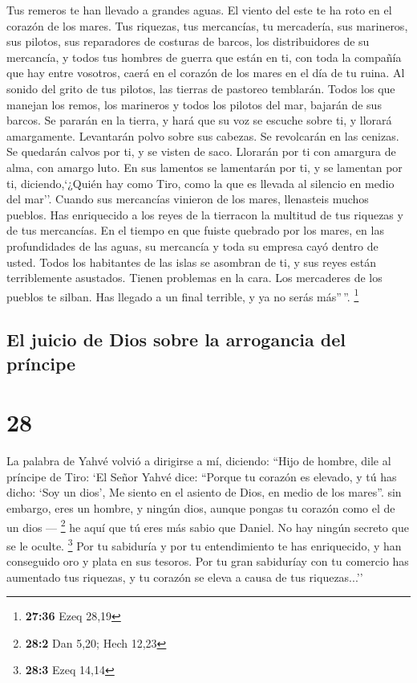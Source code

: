  Tus remeros te han llevado a grandes aguas. El viento
del este te ha roto en el corazón de los mares.  Tus
riquezas, tus mercancías, tu mercadería, sus marineros, sus pilotos, sus
reparadores de costuras de barcos, los distribuidores de su mercancía, y
todos tus hombres de guerra que están en ti, con toda la compañía que
hay entre vosotros, caerá en el corazón de los mares en el día de tu
ruina.  Al sonido del grito de tus pilotos, las tierras
de pastoreo temblarán.  Todos los que manejan los remos,
los marineros y todos los pilotos del mar, bajarán de sus barcos. Se
pararán en la tierra,  y hará que su voz se escuche sobre
ti, y llorará amargamente. Levantarán polvo sobre sus cabezas. Se
revolcarán en las cenizas.  Se quedarán calvos por ti, y
se visten de saco. Llorarán por ti con amargura de alma, con amargo
luto.  En sus lamentos se lamentarán por ti, y se
lamentan por ti, diciendo,`¿Quién hay como Tiro, como la que es llevada
al silencio en medio del mar''.  Cuando sus mercancías
vinieron de los mares, llenasteis muchos pueblos. Has enriquecido a los
reyes de la tierracon la multitud de tus riquezas y de tus mercancías.
 En el tiempo en que fuiste quebrado por los mares, en
las profundidades de las aguas, su mercancía y toda su empresa cayó
dentro de usted.  Todos los habitantes de las islas se
asombran de ti, y sus reyes están terriblemente asustados. Tienen
problemas en la cara.  Los mercaderes de los pueblos te
silban. Has llegado a un final terrible, y ya no serás más''\,''.
\footnote{\textbf{27:36} Ezeq 28,19}

\hypertarget{el-juicio-de-dios-sobre-la-arrogancia-del-pruxedncipe}{%
\subsection{El juicio de Dios sobre la arrogancia del
príncipe}\label{el-juicio-de-dios-sobre-la-arrogancia-del-pruxedncipe}}

\hypertarget{section-27}{%
\section{28}\label{section-27}}

 La palabra de Yahvé volvió a dirigirse a mí, diciendo:
 ``Hijo de hombre, dile al príncipe de Tiro: `El Señor
Yahvé dice: ``Porque tu corazón es elevado, y tú has dicho: `Soy un
dios', Me siento en el asiento de Dios, en medio de los mares''. sin
embargo, eres un hombre, y ningún dios, aunque pongas tu corazón como el
de un dios --- \footnote{\textbf{28:2} Dan 5,20; Hech 12,23}
 he aquí que tú eres más sabio que Daniel. No hay ningún
secreto que se le oculte. \footnote{\textbf{28:3} Ezeq 14,14}
 Por tu sabiduría y por tu entendimiento te has
enriquecido, y han conseguido oro y plata en sus tesoros. 
Por tu gran sabiduríay con tu comercio has aumentado tus riquezas, y tu
corazón se eleva a causa de tus riquezas...''

